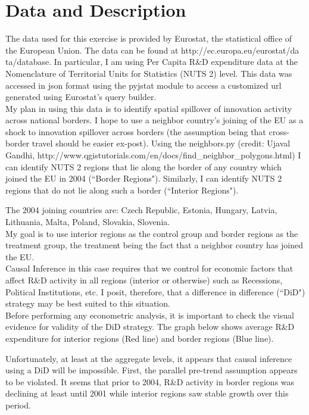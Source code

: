 \documentclass{article}
\begin{document}
\section{Data and Description}

The data used for this exercise is provided by Eurostat, the statistical office of the European Union. The data can be found at http://ec.europa.eu/eurostat/da
ta/database. In particular, I am using Per Capita R&D expenditure data at the Nomenclature of Territorial Units for Statistics (NUTS 2) level. This data was accessed in json format using the pyjstat module to access a customized url generated using Eurostat's query builder.\\

My plan in using this data is to identify spatial spillover of innovation activity across national borders. I hope to use a neighbor country's joining of the EU as a shock to innovation spillover across borders (the assumption being that cross-border travel should be easier ex-post). Using the neighbors.py (credit: Ujaval Gandhi, http://www.qgistutorials.com/en/docs/find\_neighbor\_polygons.html) I can identify NUTS 2 regions that lie along the border of any country which joined the EU in 2004 (``Border Regions"). Similarly, I can identify NUTS 2 regions that do not lie along such a border (``Interior Regions").

The 2004 joining countries are: Czech Republic, Estonia, Hungary, Latvia, Lithuania, Malta, Poland, Slovakia, Slovenia.\\

My goal is to use interior regions as the control group and border regions as the treatment group, the treatment being the fact that a neighbor country has joined the EU.\\

Causal Inference in this case requires that we control for economic factors that affect R&D activity in all regions (interior or otherwise) such as Recessions, Political Institutions, etc. I posit, therefore, that a difference in difference (``DiD") strategy may be best suited to this situation.\\

Before performing any econometric analysis, it is important to check the visual evidence for validity of the DiD strategy. The graph below shows average R&D expenditure for interior regions (Red line) and border regions (Blue line). 

Unfortunately, at least at the aggregate levels, it appears that causal inference using a DiD will be impossible. First, the parallel pre-trend assumption appears to be violated. It seems that prior to 2004, R&D activity in border regions was declining at least until 2001 while interior regions saw stable growth over this period.
\end{document}
